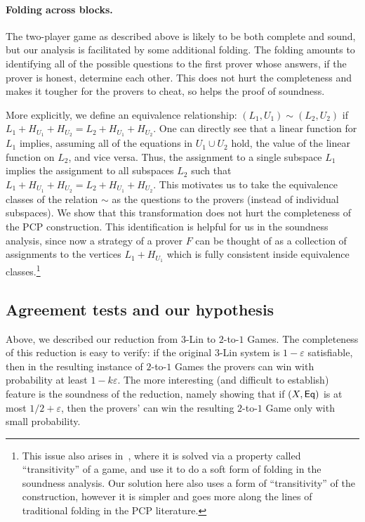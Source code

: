 \documentclass{toc}
\newcommand\eps{\varepsilon}
\def\V{\mathcal{V}}
\begin{document}
\paragraph{Folding across blocks.} The two-player game as described above is likely to be both complete and sound, but our analysis is facilitated by some additional folding. The folding amounts to identifying all of the possible questions to the first prover whose answers, if the prover is honest, determine each other. This does not hurt the completeness and makes it tougher for the provers to cheat, so helps the proof of soundness.

More explicitly, we define an equivalence relationship: $(L_1,U_1)\sim (L_2,U_2)$ if $L_1 + H_{U_1} + H_{U_2} = L_2 + H_{U_1} + H_{U_2}$.
One can directly see that a linear function for $L_1$ implies, assuming all of the equations in $U_1\cup U_2$ hold, the value of the linear function on $L_2$, and vice versa.
Thus, the assignment to a single subspace $L_1$ implies the assignment to all subspaces $L_2$ such that $L_1 + H_{U_1} + H_{U_2} = L_2 + H_{U_1} + H_{U_2}$. This motivates us to take the equivalence classes of the relation $\sim$ as the questions to the provers (instead of individual subspaces). We show that
this transformation does not hurt the completeness of the PCP construction. This identification is helpful for us in the soundness analysis,
since now a strategy of a prover $F$ can be thought of as a collection of assignments to the vertices $L_1 + H_{U_1}$ which is fully consistent inside equivalence classes.\footnote{This issue also arises in~\cite{KMS}, %
where  %
it is solved via a property called ``transitivity'' of a game, and use it to
do a soft form of folding in the soundness analysis. Our solution here also uses a 
form of ``transitivity'' of the construction, however it
is simpler and goes more along the lines of traditional folding in the PCP literature.}

\subsection{Agreement tests and our hypothesis}
\def\V{{\cal V}}
\def\D{{\cal D}}
\def\Vsat{\V_{sat}}
\def\S{\mathcal{S}}
%

Above, we described our reduction from $3$-Lin to $2$-to-$1$ Games. The completeness of
this reduction is easy to verify: if the original $3$-Lin system is $1-\eps$ satisfiable,
then in the resulting instance of $2$-to-$1$ Games the provers can win with probability
at least $1-k\eps$. The more interesting (and difficult to establish) feature is the soundness of
the reduction, namely showing that if $(X, {\sf Eq})$ is at most $1/2 + \eps$, then the
provers' can win the resulting $2$-to-$1$ Game only with small probability.
\end{document}
